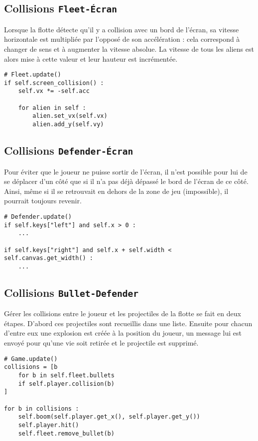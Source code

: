 \documentclass[12pt]{article}
\begin{document}
	\newpage
	\subsection{Collisions \texttt{Fleet-Écran}}

	Lorsque la flotte détecte qu'il y a collision avec un bord de l'écran, sa vitesse horizontale est multipliée par l'opposé de son accélération : cela correspond à changer de sens et à augmenter la vitesse absolue. La vitesse de tous les aliens est alors mise à cette valeur et leur hauteur est incrémentée. 

\begin{verbatim}
# Fleet.update()
if self.screen_collision() :
	self.vx *= -self.acc

	for alien in self :
		alien.set_vx(self.vx) 
		alien.add_y(self.vy) 
\end{verbatim}


	\subsection{Collisions \texttt{Defender-Écran}}

	Pour éviter que le joueur ne puisse sortir de l'écran, il n'est possible pour lui de se déplacer d'un côté que si il n'a pas déjà dépassé le bord de l'écran de ce côté. Ainsi, même si il se retrouvait en dehors de la zone de jeu (impossible), il pourrait toujours revenir.

\begin{verbatim}
# Defender.update()
if self.keys["left"] and self.x > 0 :
	...

if self.keys["right"] and self.x + self.width < self.canvas.get_width() :
	...
\end{verbatim}


	\subsection{Collisions \texttt{Bullet-Defender}}

	Gérer les collisions entre le joueur et les projectiles de la flotte se fait en deux étapes. D'abord ces projectiles sont recueillis dans une liste. Ensuite pour chacun d'entre eux une explosion est créée à la position du joueur, un message lui est envoyé pour qu'une vie soit retirée et le projectile est supprimé.

\begin{verbatim}
# Game.update()
collisions = [b 
	for b in self.fleet.bullets
	if self.player.collision(b)
]

for b in collisions :
	self.boom(self.player.get_x(), self.player.get_y())
	self.player.hit()
	self.fleet.remove_bullet(b)
\end{verbatim}
\end{document}
